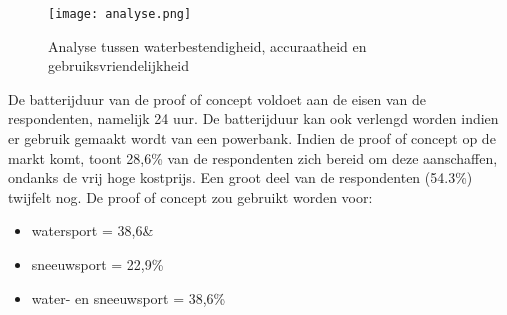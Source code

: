 \newline
\begin{figure}
	\texttt{[image: analyse.png]}
	\caption[Analyse tussen waterbestendigheid, accuraatheid en gebruiksvriendelijkheid]{Analyse tussen waterbestendigheid, accuraatheid en gebruiksvriendelijkheid}
	\label{graph:analyse}
\end{figure}
De batterijduur van de proof of concept voldoet aan de eisen van de respondenten, namelijk 24 uur. De batterijduur kan ook verlengd worden indien er gebruik gemaakt wordt van een powerbank.
\newline
Indien de proof of concept op de markt komt, toont 28,6\% van de respondenten zich bereid om deze aanschaffen, ondanks de vrij hoge kostprijs. Een groot deel van de respondenten (54.3\%) twijfelt nog. 
\newline
De proof of concept zou gebruikt worden voor:
\begin{itemize}
	\item watersport = 38,6\&
	\item sneeuwsport = 22,9\%
	\item water- en sneeuwsport = 38,6\%
\end{itemize}
\pagebreak
